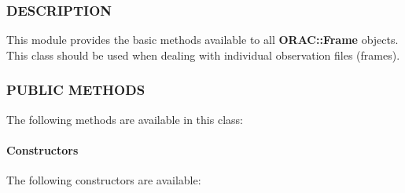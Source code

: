 \subsubsection*{DESCRIPTION\label{ORAC::Frame_DESCRIPTION}}


This module provides the basic methods available to all \textbf{ORAC::Frame}
objects. This class should be used when dealing with individual
observation files (frames).

\subsubsection*{PUBLIC METHODS\label{ORAC::Frame_PUBLIC_METHODS}}


The following methods are available in this class:

\paragraph*{Constructors\label{ORAC::Frame_Constructors}}


The following constructors are available:

